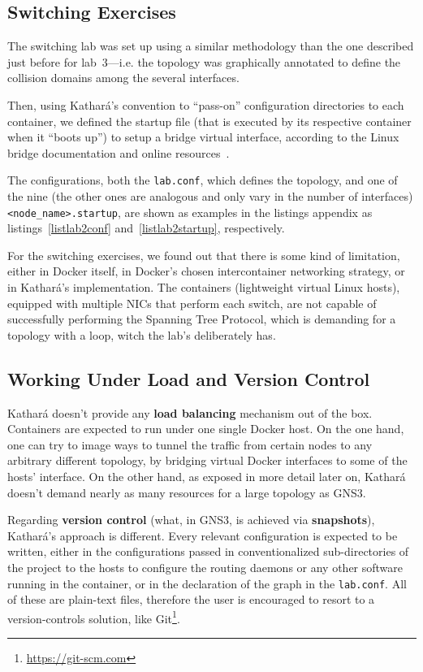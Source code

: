 \subsection{Switching Exercises}

The switching lab was set up using a similar methodology than the one described just before for lab~3---i.e. the topology was graphically annotated to define the collision domains among the several interfaces.

Then, using Kathará's convention to ``pass-on'' configuration directories to each container, we defined the startup file (that is executed by its respective container when it ``boots up'') to setup a bridge virtual interface, according to the Linux bridge documentation and online resources~\cite{brctlman,howtobridgelinux}.

The configurations, both the \texttt{lab.conf}, which defines the topology, and one of the nine (the other ones are analogous and only vary in the number of interfaces) \texttt{<node\_name>.startup}, are shown as examples in the listings appendix as listings~\ref{listlab2conf} and~\ref{listlab2startup}, respectively.

For the switching exercises, we found out that there is some kind of limitation, either in Docker itself, in Docker's chosen intercontainer networking strategy, or in Kathará's implementation.
The containers (lightweight virtual Linux hosts), equipped with multiple NICs that perform each switch, are not capable of successfully performing the Spanning Tree Protocol, which is demanding for a topology with a loop, witch the lab's deliberately has.  %

\subsection{Working Under Load and Version Control}

Kathará doesn't provide any \textbf{load balancing} mechanism out of the box.
Containers are expected to run under one single Docker host.
On the one hand, one can try to image ways to tunnel the traffic from certain nodes to any arbitrary different topology, by bridging virtual Docker interfaces to some of the hosts' interface.
On the other hand, as exposed in more detail later on, Kathará doesn't demand nearly as many resources for a large topology as GNS3.

Regarding \textbf{version control} (what, in GNS3, is achieved via \textbf{snapshots}), Kathará's approach is different.
Every relevant configuration is expected to be written, either in the configurations passed in conventionalized sub-directories of the project to the hosts to configure the routing daemons or any other software running in the container, or in the declaration of the graph in the \texttt{lab.conf}.
All of these are plain-text files, therefore the user is encouraged to resort to a version-controls solution, like Git\footnote{\url{https://git-scm.com}}.

